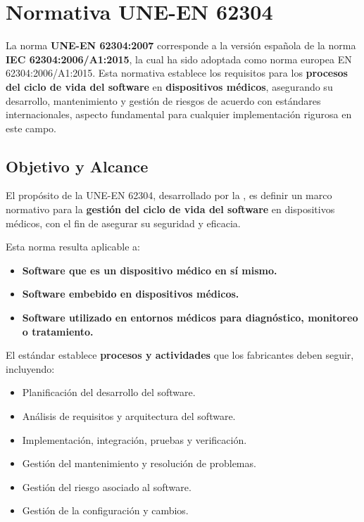 \chapter{Normativa UNE-EN 62304}\label{ch:regulatory_framework}

La norma \textbf{UNE-EN 62304:2007} \cite{UNE-EN-62304} corresponde a la versión española de la norma \textbf{IEC 62304:2006/A1:2015}, la cual ha sido adoptada como norma europea EN 62304:2006/A1:2015. Esta normativa establece los requisitos para los \textbf{procesos del ciclo de vida del software} en \textbf{dispositivos médicos}, asegurando su desarrollo, mantenimiento y gestión de riesgos de acuerdo con estándares internacionales, aspecto fundamental para cualquier implementación rigurosa en este campo.

\section{Objetivo y Alcance}
El propósito de la UNE-EN 62304, desarrollado por la \cite{UNE-EN-62304}, es definir un marco normativo para la \textbf{gestión del ciclo de vida del software} en dispositivos médicos, con el fin de asegurar su seguridad y eficacia.

Esta norma resulta aplicable a:
\begin{itemize}
    \item \textbf{Software que es un dispositivo médico en sí mismo.}
    \item \textbf{Software embebido en dispositivos médicos.}
    \item \textbf{Software utilizado en entornos médicos para diagnóstico, monitoreo o tratamiento.}
\end{itemize}

El estándar establece \textbf{procesos y actividades} que los fabricantes deben seguir, incluyendo:
\begin{itemize}
    \item Planificación del desarrollo del software.
    \item Análisis de requisitos y arquitectura del software.
    \item Implementación, integración, pruebas y verificación.
    \item Gestión del mantenimiento y resolución de problemas.
    \item Gestión del riesgo asociado al software.
    \item Gestión de la configuración y cambios.
\end{itemize}

